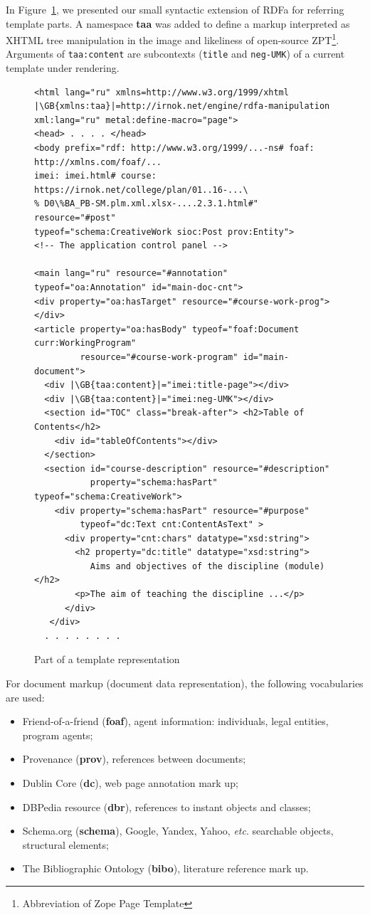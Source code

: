 \documentclass[
]{ceurart}
\newcommand{\GB}[1]{\colorbox{green}{#1}}
\begin{document}
In Figure~\ref{fig:auth-code}, we presented our small syntactic extension of RDFa for referring template parts.  A namespace \textbf{taa} was added to define a markup interpreted as XHTML tree manipulation in the image and likeliness of open-source ZPT\footnote{Abbreviation of Zope Page Template}.  Arguments of \verb|taa:content| are subcontexts (\verb|title| and \verb|neg-UMK|) of a current template under rendering.
\begin{figure}
  \centering
\begin{verbatim}
<html lang="ru" xmlns=http://www.w3.org/1999/xhtml
|\GB{xmlns:taa}|=http://irnok.net/engine/rdfa-manipulation
xml:lang="ru" metal:define-macro="page">
<head> . . . . </head>
<body prefix="rdf: http://www.w3.org/1999/...-ns# foaf: http://xmlns.com/foaf/...
imei: imei.html# course: https://irnok.net/college/plan/01..16-...\
% D0\%BA_PB-SM.plm.xml.xlsx-....2.3.1.html#"  resource="#post"
typeof="schema:CreativeWork sioc:Post prov:Entity">
<!-- The application control panel -->

<main lang="ru" resource="#annotation" typeof="oa:Annotation" id="main-doc-cnt">
<div property="oa:hasTarget" resource="#course-work-prog"></div>
<article property="oa:hasBody" typeof="foaf:Document curr:WorkingProgram"
         resource="#course-work-program" id="main-document">
  <div |\GB{taa:content}|="imei:title-page"></div>
  <div |\GB{taa:content}|="imei:neg-UMK"></div>
  <section id="TOC" class="break-after"> <h2>Table of Contents</h2>
    <div id="tableOfContents"></div>
  </section>
  <section id="course-description" resource="#description"
           property="schema:hasPart" typeof="schema:CreativeWork">
    <div property="schema:hasPart" resource="#purpose"
         typeof="dc:Text cnt:ContentAsText" >
      <div property="cnt:chars" datatype="xsd:string">
        <h2 property="dc:title" datatype="xsd:string">
           Aims and objectives of the discipline (module)</h2>
        <p>The aim of teaching the discipline ...</p>
      </div>
   </div>
  . . . . . . . .
\end{verbatim}
  \caption{Part of a template representation}
  \label{fig:auth-code}
\end{figure}

For document markup (document data representation), the following vocabularies are used:
\begin{itemize}
  \item Friend-of-a-friend (\textbf{foaf}), agent information: individuals, legal entities, program agents;
  \item Provenance (\textbf{prov}), references between documents;
  \item Dublin Core (\textbf{dc}), web page annotation mark up;
  \item DBPedia resource (\textbf{dbr}), references to instant objects and classes;
  \item Schema.org (\textbf{schema}), Google, Yandex, Yahoo, \emph{etc}. searchable objects, structural elements;
  \item The Bibliographic Ontology (\textbf{bibo}), literature reference mark up.
\end{itemize}
\end{document}
